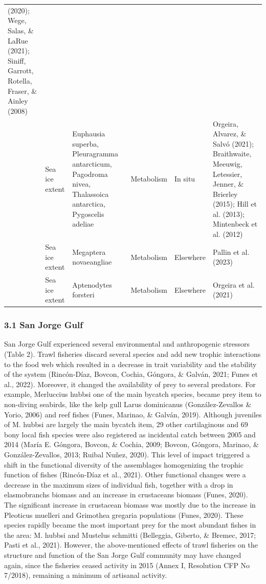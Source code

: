 \documentclass[
]{article}
\begin{document}
\begin{landscape}
\begin{longtable}{ L{2.1cm} L{2.5cm} L{4cm} L{2.5cm} L{2cm} L{3cm} }
(2020); Wege, Salas, \& LaRue (2021); Siniff, Garrott, Rotella, Fraser,
\& Ainley (2008) \\
& Sea ice extent & Euphausia superba, Pleuragramma antarcticum,
Pagodroma nivea, Thalassoica antarctica, Pygoscelis adeliae & Metabolism
& In situ & Orgeira, Alvarez, \& Salvó (2021); Braithwaite, Meeuwig,
Letessier, Jenner, \& Brierley (2015); Hill et al. (2013); Mintenbeck et
al. (2012) \\
& Sea ice extent & Megaptera novaeangliae & Metabolism & Elsewhere &
Pallin et al. (2023) \\
& Sea ice extent & Aptenodytes forsteri & Metabolism & Elsewhere &
Orgeira et al. (2021) \\
\end{longtable}

\end{landscape}
\normalsize

\hypertarget{san-jorge-gulf}{%
\subsubsection{3.1 San Jorge Gulf}\label{san-jorge-gulf}}

San Jorge Gulf experienced several environmental and anthropogenic
stressors (Table 2). Trawl fisheries discard several species and add new
trophic interactions to the food web which resulted in a decrease in
trait variability and the stability of the system (Rincón-Díaz, Bovcon,
Cochia, Góngora, \& Galván, 2021; Funes et al., 2022). Moreover, it
changed the availability of prey to several predators. For example,
Merluccius hubbsi one of the main bycatch species, became prey item to
non-diving seabirds, like the kelp gull Larus dominicanus
(González-Zevallos \& Yorio, 2006) and reef fishes (Funes, Marinao, \&
Galván, 2019). Although juveniles of M. hubbsi are largely the main
bycatch item, 29 other cartilaginous and 69 bony local fish species were
also registered as incidental catch between 2005 and 2014 (María E.
Góngora, Bovcon, \& Cochia, 2009; Bovcon, Góngora, Marinao, \&
González-Zevallos, 2013; Ruibal Nuñez, 2020). This level of impact
triggered a shift in the functional diversity of the assemblages
homogenizing the trophic function of fishes (Rincón-Díaz et al., 2021).
Other functional changes were a decrease in the maximum sizes of
individual fish, together with a drop in elasmobranchs biomass and an
increase in crustaceans biomass (Funes, 2020). The significant increase
in crustacean biomass was mostly due to the increase in Pleoticus
muelleri and Grimothea gregaria populations (Funes, 2020). These species
rapidly became the most important prey for the most abundant fishes in
the area: M. hubbsi and Mustelus schmitti (Belleggia, Giberto, \&
Bremec, 2017; Pasti et al., 2021). However, the above-mentioned effects
of trawl fisheries on the structure and function of the San Jorge Gulf
community may have changed again, since the fisheries ceased activity in
2015 (Annex I, Resolution CFP No 7/2018), remaining a minimum of
artisanal activity.
\end{document}
